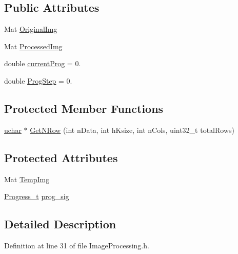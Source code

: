 \subsection*{Public Attributes}
\begin{DoxyCompactItemize}
\item 
Mat \hyperlink{class_vision_1_1_image_processing_a77c370dab270158a4e9c634e2d3f48e7}{Original\+Img}
\item 
Mat \hyperlink{class_vision_1_1_image_processing_aa7d65742882cd1b2a1e4e9cb68809211}{Processed\+Img}
\item 
double \hyperlink{class_vision_1_1_image_processing_ac06b3b9501cde8e742aaf99d986af256}{current\+Prog} = 0.
\item 
double \hyperlink{class_vision_1_1_image_processing_a7438451f9a447a33e9f04bf8e73eae31}{Prog\+Step} = 0.
\end{DoxyCompactItemize}
\subsection*{Protected Member Functions}
\begin{DoxyCompactItemize}
\item 
\hyperlink{_soil_math_types_8h_a65f85814a8290f9797005d3b28e7e5fc}{uchar} $\ast$ \hyperlink{class_vision_1_1_image_processing_a56e17515a15eb7d246985e550fc89610}{Get\+N\+Row} (int n\+Data, int h\+Ksize, int n\+Cols, uint32\+\_\+t total\+Rows)
\end{DoxyCompactItemize}
\subsection*{Protected Attributes}
\begin{DoxyCompactItemize}
\item 
Mat \hyperlink{class_vision_1_1_image_processing_a5371ad8d6f7aac9d43ee5c902ade7435}{Temp\+Img}
\item 
\hyperlink{class_vision_1_1_image_processing_a8aada262447aa24be36586ea9d188930}{Progress\+\_\+t} \hyperlink{class_vision_1_1_image_processing_ac0c168e16365ff5941791f67ec895663}{prog\+\_\+sig}
\end{DoxyCompactItemize}


\subsection{Detailed Description}


Definition at line 31 of file Image\+Processing.\+h.




